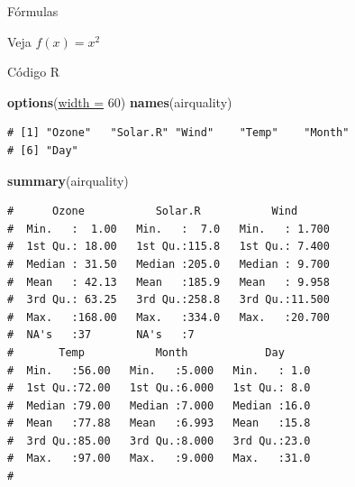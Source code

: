 \documentclass[10pt,ignorenonframetext,]{beamer}
\newenvironment{Shaded}{\begin{snugshade}}{\end{snugshade}}
\newcommand{\DataTypeTok}[1]{\textcolor[rgb]{0.74,0.68,0.62}{\underline{#1}}}
\newcommand{\DecValTok}[1]{\textcolor[rgb]{0.27,0.67,0.26}{#1}}
\newcommand{\KeywordTok}[1]{\textcolor[rgb]{0.26,0.66,0.93}{\textbf{#1}}}
\newcommand{\NormalTok}[1]{\textcolor[rgb]{0.74,0.68,0.62}{#1}}
\begin{document}
\begin{frame}{Fórmulas}
\protect\hypertarget{fuxf3rmulas}{}

Veja \(f(x)=x^2\)

\end{frame}

\begin{frame}[fragile]{Código R}
\protect\hypertarget{cuxf3digo-r}{}

\begin{Shaded}
\begin{Highlighting}[]
\KeywordTok{options}\NormalTok{(}\DataTypeTok{width =} \DecValTok{60}\NormalTok{)}
\KeywordTok{names}\NormalTok{(airquality)}
\end{Highlighting}
\end{Shaded}

\begin{verbatim}
# [1] "Ozone"   "Solar.R" "Wind"    "Temp"    "Month"  
# [6] "Day"
\end{verbatim}

\begin{Shaded}
\begin{Highlighting}[]
\KeywordTok{summary}\NormalTok{(airquality)}
\end{Highlighting}
\end{Shaded}

\begin{verbatim}
#      Ozone           Solar.R           Wind       
#  Min.   :  1.00   Min.   :  7.0   Min.   : 1.700  
#  1st Qu.: 18.00   1st Qu.:115.8   1st Qu.: 7.400  
#  Median : 31.50   Median :205.0   Median : 9.700  
#  Mean   : 42.13   Mean   :185.9   Mean   : 9.958  
#  3rd Qu.: 63.25   3rd Qu.:258.8   3rd Qu.:11.500  
#  Max.   :168.00   Max.   :334.0   Max.   :20.700  
#  NA's   :37       NA's   :7                       
#       Temp           Month            Day      
#  Min.   :56.00   Min.   :5.000   Min.   : 1.0  
#  1st Qu.:72.00   1st Qu.:6.000   1st Qu.: 8.0  
#  Median :79.00   Median :7.000   Median :16.0  
#  Mean   :77.88   Mean   :6.993   Mean   :15.8  
#  3rd Qu.:85.00   3rd Qu.:8.000   3rd Qu.:23.0  
#  Max.   :97.00   Max.   :9.000   Max.   :31.0  
# 
\end{verbatim}

\end{frame}
\end{document}
